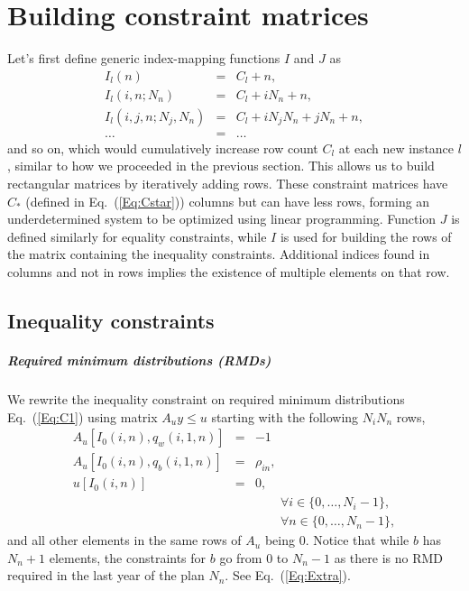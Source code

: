 \documentclass{report}[fleqn,11pt]
\begin{document}
\chapter{Building constraint matrices}
Let's first define generic index-mapping functions $I$ and $J$ as
\begin{eqnarray}
	\label{Eq:Offsets}
	I_l(n) &=& C_l + n, \nonumber \\
	I_l(i, n; N_n) &=& C_l + iN_n + n, \nonumber \\
	I_l(i, j, n; N_j, N_n) &=& C_l + iN_j N_n + jN_n +n, \\
	\ldots &=& \ldots \nonumber
\end{eqnarray}
and so on, which would cumulatively increase row count $C_l$ at each new instance $l$,
similar to how we proceeded in the previous section.
This allows us to build rectangular matrices by iteratively adding rows.
These constraint matrices have $C_*$ (defined in Eq.~(\ref{Eq:Cstar}))
columns but can have less rows,
forming an underdetermined system to be optimized using linear programming.
Function $J$ is defined similarly for equality constraints, while $I$ is used
for building the rows of the matrix containing the inequality constraints.
Additional indices found in columns and not in rows implies the existence of multiple elements on that row. 

\section{Inequality constraints}

\paragraph*{Required minimum distributions (RMDs)}
We rewrite the inequality constraint on required minimum distributions
Eq.~(\ref{Eq:C1}) using matrix $A_{u}y \le u$ starting with the following $N_iN_n$ rows, 
\begin{eqnarray}
	A_u[I_0(i, n), q_w(i, 1, n)] &=& -1 \nonumber \\
	A_u[I_0(i, n), q_b(i, 1, n)] &=& \rho_{in}, \nonumber \\
	u[I_0(i, n)] &=& 0, \\
	&&\qquad\forall i \in \{0,\ldots, N_i - 1\}, \nonumber\\
	&&\qquad\forall n \in \{0,\ldots, N_n - 1\},\nonumber
\end{eqnarray}
and all other elements in the same rows of $A_u$ being $0$.
Notice that while $b$ has $N_n+1$ elements, the constraints
for $b$ go from $0$ to $N_n-1$ as there is no RMD required in the last year of the plan $N_n$.
See Eq.~(\ref{Eq:Extra}).
\end{document}

